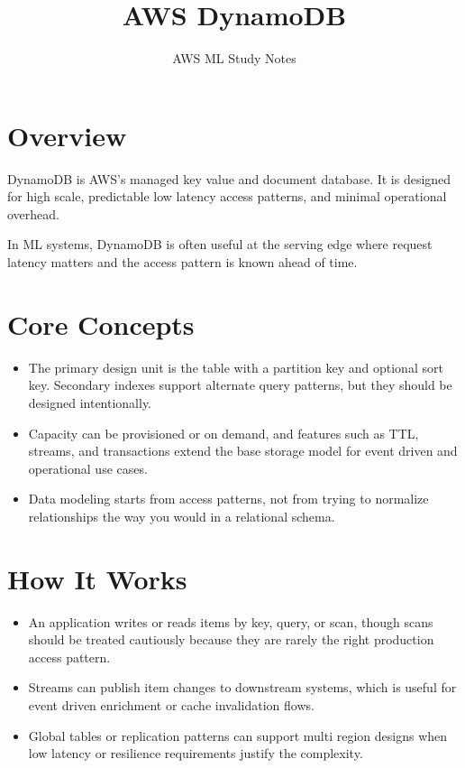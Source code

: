 \documentclass[10pt,twocolumn]{article}
\begin{document}
\title{\vspace{-1.6cm}AWS DynamoDB}
\author{AWS ML Study Notes}
\date{}
\maketitle
\small

\section*{Overview}
DynamoDB is AWS's managed key value and document database. It is designed for high scale, predictable low latency access patterns, and minimal operational overhead.

In ML systems, DynamoDB is often useful at the serving edge where request latency matters and the access pattern is known ahead of time.

\section*{Core Concepts}
\begin{itemize}
\item The primary design unit is the table with a partition key and optional sort key. Secondary indexes support alternate query patterns, but they should be designed intentionally.
\item Capacity can be provisioned or on demand, and features such as TTL, streams, and transactions extend the base storage model for event driven and operational use cases.
\item Data modeling starts from access patterns, not from trying to normalize relationships the way you would in a relational schema.
\end{itemize}

\section*{How It Works}
\begin{itemize}
\item An application writes or reads items by key, query, or scan, though scans should be treated cautiously because they are rarely the right production access pattern.
\item Streams can publish item changes to downstream systems, which is useful for event driven enrichment or cache invalidation flows.
\item Global tables or replication patterns can support multi region designs when low latency or resilience requirements justify the complexity.
\end{itemize}
\end{document}
